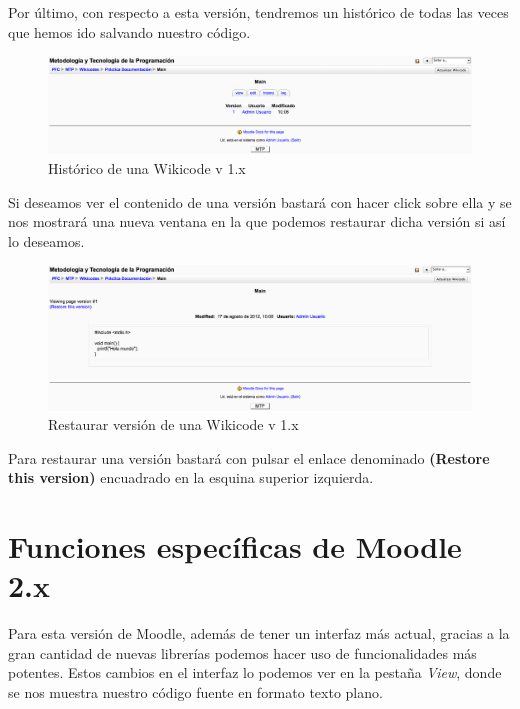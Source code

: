 \newpage

Por último, con respecto a esta versión, tendremos un histórico de todas las veces que hemos ido salvando nuestro código.

\begin{figure}[h]
	\label{v1history1.eps}
	\includegraphics[width=\textwidth]{./img/v1history1.eps}
	\caption{Histórico de una Wikicode v 1.x}
\end{figure}

Si deseamos ver el contenido de una versión bastará con hacer click sobre ella y se nos mostrará una nueva ventana en la que podemos restaurar dicha versión si así lo deseamos.

\begin{figure}[h]
	\label{v1history2.eps}
	\includegraphics[width=\textwidth]{./img/v1history2.eps}
	\caption{Restaurar versión de una Wikicode v 1.x}
\end{figure}

Para restaurar una versión bastará con pulsar el enlace denominado \textbf{(Restore this version)} encuadrado en la esquina superior izquierda.

\newpage

\section{Funciones específicas de Moodle 2.x}

Para esta versión de Moodle, además de tener un interfaz más actual, gracias a la gran cantidad de nuevas librerías podemos hacer uso de funcionalidades más potentes. Estos cambios en el interfaz lo podemos ver en la pestaña \emph{View}, donde se nos muestra nuestro código fuente en formato texto plano.

